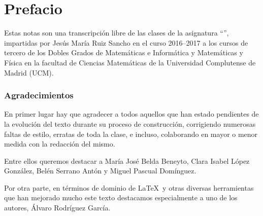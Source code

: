 \chapter*{Prefacio}
\label{pref}
Estas notas son una transcripción libre de las clases de la asignatura ``'', impartidas por Jesús María Ruiz Sancho en el curso 2016--2017 a los cursos de tercero de los Dobles Grados de Matemáticas e Informática y Matemáticas y Física en la facultad de Ciencias Matemáticas de la Universidad Complutense de Madrid (UCM).

\subsection*{Agradecimientos}
En primer lugar hay que agradecer a todos aquellos que han estado pendientes de la evolución del texto durante su proceso de construcción, corrigiendo numerosas faltas de estilo, erratas de toda la clase, e incluso, colaborando en mayor o menor medida con la redacción del mismo.

Entre ellos queremos destacar a María José Belda Beneyto, Clara Isabel López González, Belén Serrano Antón y Miguel Pascual Domínguez.

Por otra parte, en términos de dominio de \LaTeX\ y otras diversas herramientas que han mejorado mucho este texto destacamos especialmente a uno de los autores, Álvaro Rodríguez García.